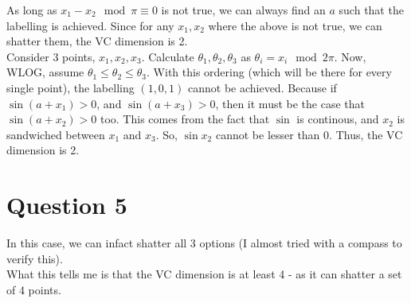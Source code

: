 \documentclass[a4paper]{article}
\begin{document}
As long as $x_1 - x_2 \mod \pi \equiv 0$ is not true, we can always find an $a$ such that the labelling is achieved. Since for any $x_1, x_2$ where the above is not true, we can shatter them, the VC dimension is 2.\\

Consider 3 points, $x_1, x_2, x_3$. Calculate $\theta_1, \theta_2, \theta_3$ as $\theta_i = x_i \mod 2\pi$. Now, WLOG, assume $\theta_1 \leq \theta_2 \leq \theta_3$. With this ordering (which will be there for every single point), the labelling $(1, 0, 1)$ cannot be achieved. Because if $\sin(a + x_1) > 0$, and $\sin(a + x_3) > 0$, then it must be the case that $\sin(a + x_2) > 0$ too. This comes from the fact that $\sin$ is continous, and $x_2$ is sandwiched between $x_1$ and $x_3$. So, $\sin x_2$ cannot be lesser than $0$. Thus, the VC dimension is 2.

\newpage

\section{Question 5}

In this case, we can infact shatter all 3 options (I almost tried with a compass to verify this).\\

What this tells me is that the VC dimension is at least 4 - as it can shatter a set of 4 points. 
\end{document}
